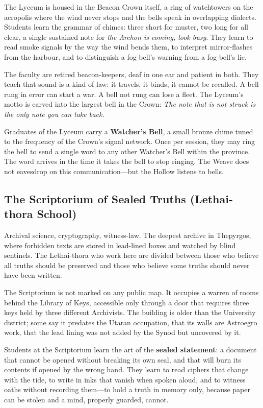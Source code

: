 \documentclass[10pt,twocolumn]{book}
\begin{document}
The Lyceum is housed in the Beacon Crown itself, a ring of watchtowers on the acropolis where the wind never stops and the bells speak in overlapping dialects. Students learn the grammar of chimes: three short for muster, two long for all clear, a single sustained note for \textit{the Archon is coming, look busy}. They learn to read smoke signals by the way the wind bends them, to interpret mirror-flashes from the harbour, and to distinguish a fog-bell's warning from a fog-bell's lie.

The faculty are retired beacon-keepers, deaf in one ear and patient in both. They teach that sound is a kind of law: it travels, it binds, it cannot be recalled. A bell rung in error can start a war. A bell not rung can lose a fleet. The Lyceum's motto is carved into the largest bell in the Crown: \textit{The note that is not struck is the only note you can take back.}

Graduates of the Lyceum carry a \textbf{Watcher's Bell}, a small bronze chime tuned to the frequency of the Crown's signal network. Once per session, they may ring the bell to send a single word to any other Watcher's Bell within the province. The word arrives in the time it takes the bell to stop ringing. The Weave does not eavesdrop on this communication---but the Hollow listens to bells.

\subsection{The Scriptorium of Sealed Truths (Lethai-thora School)}

Archival science, cryptography, witness-law. The deepest archive in Thepyrgos, where forbidden texts are stored in lead-lined boxes and watched by blind sentinels. The Lethai-thora who work here are divided between those who believe all truths should be preserved and those who believe some truths should never have been written.

The Scriptorium is not marked on any public map. It occupies a warren of rooms behind the Library of Keys, accessible only through a door that requires three keys held by three different Archivists. The building is older than the University district; some say it predates the Utaran occupation, that its walls are Astroegro work, that the lead lining was not added by the Synod but uncovered by it.

Students at the Scriptorium learn the art of the \textbf{sealed statement}: a document that cannot be opened without breaking its own seal, and that will burn its contents if opened by the wrong hand. They learn to read ciphers that change with the tide, to write in inks that vanish when spoken aloud, and to witness oaths without recording them---to hold a truth in memory only, because paper can be stolen and a mind, properly guarded, cannot.
\end{document}
